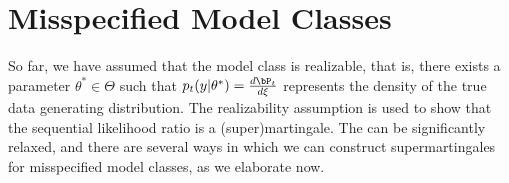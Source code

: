\section{Misspecified Model Classes}\label{sec:misspecified}

So far, we have assumed that the model class is realizable, that is, there exists a parameter $\theta^* \in \Theta$ such that $p_t(y|\theta^*) = \frac{d\bP_t}{d\xi}$ represents the density of the true data generating distribution. The realizability assumption is used to show that the sequential likelihood ratio is a (super)martingale. The can be significantly relaxed, and there are several ways in which we can construct supermartingales for misspecified model classes, as we elaborate now. 








